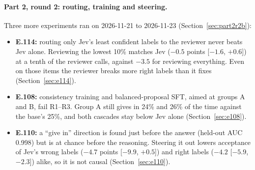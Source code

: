 \documentclass[11pt]{article}
\renewcommand{\_}{\origunderscore\allowbreak}
\begin{document}
\paragraph{Part 2, round 2: routing, training and steering.} Three more experiments ran on 2026-11-21 to 2026-11-23 (Section~\ref{sec:part2r2b}):
\begin{itemize}[leftmargin=*,itemsep=2pt]
  \item \textbf{E.114:} routing only Jev's least confident labels to the reviewer never beats Jev alone. Reviewing the lowest 10\% matches Jev ($-0.5$ points [$-1.6$, $+0.6$]) at a tenth of the reviewer calls, against $-3.5$ for reviewing everything. Even on those items the reviewer breaks more right labels than it fixes (Section~\ref{sec:e114}).
  \item \textbf{E.108:} consistency training and balanced-proposal SFT, aimed at groups A and B, fail R1--R3. Group A still gives in 24\% and 26\% of the time against the base's 25\%, and both cascades stay below Jev alone (Section~\ref{sec:e108}).
  \item \textbf{E.110:} a ``give in'' direction is found just before the answer (held-out AUC 0.998) but is at chance before the reasoning. Steering it out lowers acceptance of Jev's wrong labels ($-4.7$ points [$-9.9$, $+0.5$]) and right labels ($-4.2$ [$-5.9$, $-2.3$]) alike, so it is not causal (Section~\ref{sec:e110}).
\end{itemize}
\end{document}
